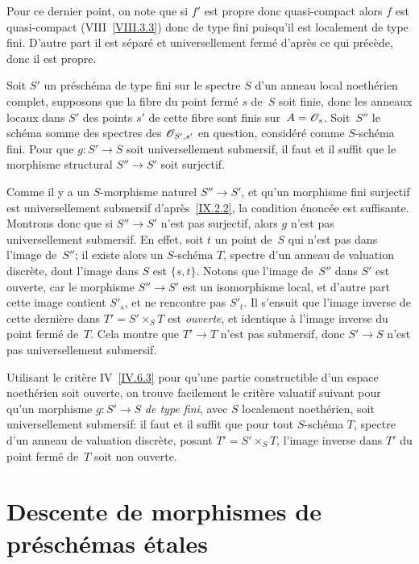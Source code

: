 Pour ce dernier point, on note que si $f'$ est propre donc
quasi-compact alors $f$ est quasi-compact (VIII~\ref{VIII.3.3}) donc
de type fini puisqu'il est localement de type fini. D'autre part il
est s\'epar\'e et universellement ferm\'e d'apr\`es ce qui
pr\'ec\`ede, donc il est propre.
\begin{proposition}
\label{IX.2.5}
Soit $S'$ un pr\'esch\'ema de type fini sur le spectre $S$ d'un
anneau local noeth\'erien complet, supposons que la fibre du point
ferm\'e $s$ de~$S$ soit finie, donc les anneaux locaux dans $S'$ des
points $s'$ de cette fibre sont finis sur~$A=\cal{O}_s$. Soit~$S''$ le
sch\'ema somme des spectres des $\cal{O}_{S',s'}$ en question,
consid\'er\'e comme $S$-sch\'ema fini. Pour que $g\colon S' \to
S$ soit universellement submersif, il faut et il suffit que le
morphisme structural $S''\to S'$ soit surjectif.
\end{proposition}

Comme il y a un $S$-morphisme naturel $S'' \to S'$, et qu'un morphisme
fini surjectif est universellement submersif d'apr\`es~\ref{IX.2.2},
la condition \'enonc\'ee est suffisante. Montrons donc que si
$S''\to S'$ n'est pas surjectif, alors $g$ n'est pas universellement
submersif. En effet, soit $t$ un point de~$S$ qui n'est pas dans
l'image de~$S''$; il existe alors un $S$-sch\'ema $T$, spectre d'un
anneau de valuation discr\`ete, dont l'image dans $S$ est
$\{s,t\}$. Notons que l'image de~$S''$ dans $S'$ est ouverte, car le
morphisme $S'' \to S'$ est un isomorphisme local, et d'autre part
cette image contient $S'_s$, et ne rencontre pas $S'_t$. Il s'ensuit
que l'image inverse de cette derni\`ere dans $T'=S'\times_S T$ est
\emph{ouverte}, et identique \`a l'image inverse du point ferm\'e
de~$T$. Cela montre que $T'\to T$ n'est pas submersif, donc $S'\to S$
n'est pas universellement submersif.
\begin{remarque}
\label{IX.2.6}
Utilisant le crit\`ere IV~\ref{IV.6.3} pour qu'une partie
constructible d'un espace noeth\'erien soit ouverte, on trouve
facilement le crit\`ere valuatif suivant pour qu'un morphisme
$g\colon S'\to S$ \emph{de type fini}, avec $S$ localement
noeth\'erien, soit universellement submersif: il faut et il suffit
que pour tout $S$-sch\'ema $T$, spectre d'un anneau de valuation
discr\`ete, posant $T'=S'\times_S T$, l'image inverse dans $T'$ du
point ferm\'e de~$T$ soit non ouverte.
\end{remarque}

\section{Descente de morphismes de pr\'esch\'emas \'etales}
\label{IX.3}

